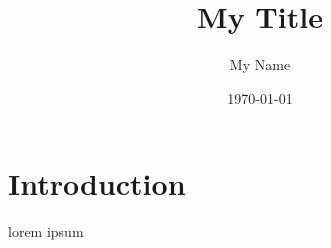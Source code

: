 \documentclass[10pt]{article}
\title{My Title}
\author{My Name}
\date{\today}
\begin{document}
    \maketitle
    \section{Introduction}
    lorem ipsum
    
\end{document}
